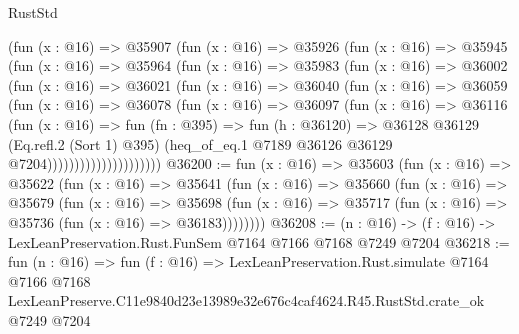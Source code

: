 \begin{lexlean}{RustStd}
\begin{coremodule}
                  (fun (x : @16) =>
                  @35907
                    (fun (x : @16) =>
                    @35926
                      (fun (x : @16) =>
                      @35945
                        (fun (x : @16) =>
                        @35964
                          (fun (x : @16) =>
                          @35983
                            (fun (x : @16) =>
                            @36002
                              (fun (x : @16) =>
                              @36021
                                (fun (x : @16) =>
                                @36040
                                  (fun (x : @16) =>
                                  @36059
                                    (fun (x : @16) =>
                                    @36078
                                      (fun (x : @16) =>
                                      @36097
                                        (fun (x : @16) =>
                                        @36116
                                          (fun (x : @16) =>
                                          fun (fn : @395) =>
                                          fun (h : @36120) =>
                                          @36128
                                            @36129
                                            (Eq.refl.{2} (Sort 1) @395)
                                            (heq_of_eq.{1}
                                              @7189
                                              @36126
                                              @36129
                                              @7204)))))))))))))))))))))
@36200 := fun (x : @16) =>
  @35603
    (fun (x : @16) =>
    @35622
      (fun (x : @16) =>
      @35641
        (fun (x : @16) =>
        @35660
          (fun (x : @16) =>
          @35679
            (fun (x : @16) =>
            @35698
              (fun (x : @16) => @35717 (fun (x : @16) => @35736 (fun (x : @16) => @36183))))))))
@36208 := (n : @16) -> (f : @16) -> LexLeanPreservation.Rust.FunSem @7164 @7166 @7168 @7249 @7204
@36218 := fun (n : @16) =>
  fun (f : @16) =>
  LexLeanPreservation.Rust.simulate
    @7164
    @7166
    @7168
    LexLeanPreserve.C11e9840d23e13989e32e676c4caf4624.R45.RustStd.crate_ok
    @7249
    @7204
\end{coremodule}
\end{lexlean}
